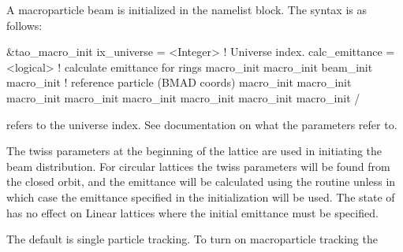 {{{{{{{{A macroparticle beam is initialized in the  namelist block.
The syntax is as follows:
\begin{example}
  &tao_macro_init
    ix_universe             = <Integer>   ! Universe index.
    calc_emittance          = <logical>   ! calculate emittance for rings
    macro_init%
    macro_init%
    beam_init%
    macro_init%
                                          ! reference particle (BMAD coords)
    macro_init%
    macro_init%
    macro_init%
    macro_init%
    macro_init%
    macro_init%
    macro_init%
    macro_init%
  /
\end{example}
 refers to the universe index. See \bmad documentation
on what the  parameters refer to.

The twiss parameters at the beginning of the lattice are used in
initiating the beam distribution.  For circular lattices the twiss
parameters will be found from the closed orbit, and the emittance will
be calculated using the \bmad routine  unless
 in which case the emittance specified in the
initialization will be used. The state of  has no
effect on Linear lattices where the initial emittance must be
specified.

The default is single particle tracking. To turn on macroparticle
tracking the \vn{global%
This can be placed in the \vn{tao_params} namelist above, for example,
\begin{example}
  &tao_params
    n_v1_var_max  = 5
    n_d2_data_max = 6
    n_data_max    = 2000
    n_var_max     = 2000
    global%
    global%
  /
\end{example}

}}}}}}}}}
